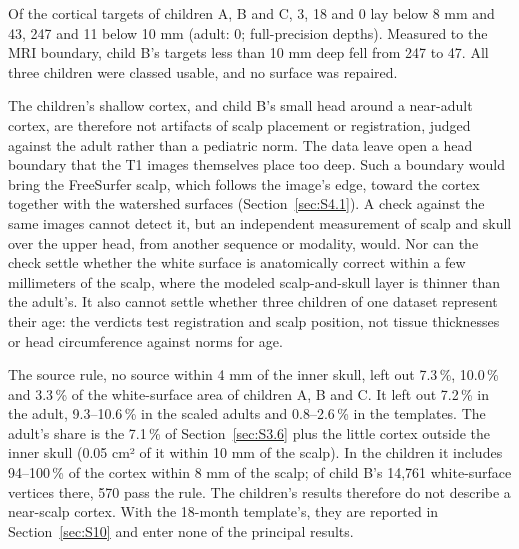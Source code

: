 \documentclass[preprint,12pt,authoryear,a4paper]{elsarticle}
\begin{document}
Of the cortical targets of children A, B and C, 3, 18 and 0 lay below 8 mm and 43, 247 and 11 below 10 mm (adult: 0; full-precision depths). Measured to the MRI boundary, child B's targets less than 10 mm deep fell from 247 to 47. All three children were classed usable, and no surface was repaired.

The children's shallow cortex, and child B's small head around a near-adult cortex, are therefore not artifacts of scalp placement or registration, judged against the adult rather than a pediatric norm. The data leave open a head boundary that the T1 images themselves place too deep. Such a boundary would bring the FreeSurfer scalp, which follows the image's edge, toward the cortex together with the watershed surfaces (Section~\ref{sec:S4.1}). A check against the same images cannot detect it, but an independent measurement of scalp and skull over the upper head, from another sequence or modality, would. Nor can the check settle whether the white surface is anatomically correct within a few millimeters of the scalp, where the modeled scalp-and-skull layer is thinner than the adult's. It also cannot settle whether three children of one dataset represent their age: the verdicts test registration and scalp position, not tissue thicknesses or head circumference against norms for age.

The source rule, no source within 4 mm of the inner skull, left out 7.3\,\%, 10.0\,\% and 3.3\,\% of the white-surface area of children A, B and C. It left out 7.2\,\% in the adult, 9.3–10.6\,\% in the scaled adults and 0.8–2.6\,\% in the templates. The adult's share is the 7.1\,\% of Section~\ref{sec:S3.6} plus the little cortex outside the inner skull (0.05 cm² of it within 10 mm of the scalp). In the children it includes 94–100\,\% of the cortex within 8 mm of the scalp; of child B's 14,761 white-surface vertices there, 570 pass the rule. The children's results therefore do not describe a near-scalp cortex. With the 18-month template's, they are reported in Section~\ref{sec:S10} and enter none of the principal results.
\end{document}
